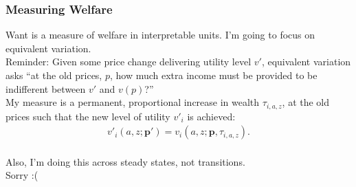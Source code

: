 \documentclass[9pt,pdftex,aspectratio=1610]{beamer}
\theoremstyle{definition}
\begin{document}

\begin{frame}[t]
\frametitle{Measuring Welfare}
\smallskip
Want is a measure of welfare in interpretable units. I'm going to focus on equivalent variation. \\
\medskip
Reminder: Given some price change delivering utility level $v'$, equivalent variation asks ``at the old prices, $p$, how much extra income must be provided to be indifferent between $v'$ and $v(p)$?''\\
\bigskip
\bigskip
My measure is a permanent, proportional increase in wealth $\tau_{i,a,z}$, at the old prices such that the new level of utility $v'_i$ is achieved:
\begin{align}
v'_i(a,z ; \mathbf{p'}) = v_i(a,z ; \mathbf{p}, \tau_{i, a,z}).  \nonumber
\end{align}\\
\bigskip
\bigskip
Also, I'm doing this across steady states, not transitions.\\ Sorry :(
\end{frame}


\end{document}
